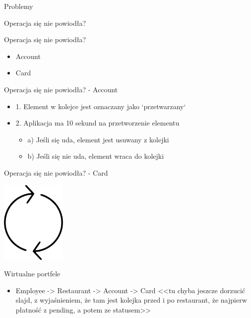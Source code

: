 \documentclass{beamer}
\begin{document}
\begin{frame}{Problemy}
	\begin{center}
		\Huge{Operacja się nie powiodła?}
	\end{center}
\end{frame}

\begin{frame}{Operacja się nie powiodła?}
	\begin{huge}
		\begin{itemize}
			\item Account
			\item Card
		\end{itemize}
	\end{huge}
\end{frame}

\begin{frame}{Operacja się nie powiodła? - Account}
	\begin{Large}
		\begin{itemize}[<+->]
			\item 1. Element w kolejce jest oznaczany jako `przetwarzany`
			\item 2. Aplikacja ma 10 sekund na przetworzenie elementu
			\begin{itemize}[<+->]
				\item \Large{a) Jeśli się uda, element jest usuwany z kolejki}
				\item \Large{b) Jeśli się nie uda, element wraca do kolejki}
			\end{itemize}
		\end{itemize}
	\end{Large}
\end{frame}

\begin{frame}{Operacja się nie powiodła? - Card}
	\begin{center}
		\includegraphics[height=4cm]{cykl1.png}
	\end{center}
\end{frame}

\begin{frame}{Wirtualne portfele}
	\begin{huge}
		\begin{itemize}
			\item Employee -> Restaurant -> Account -> Card <<tu chyba jeszcze dorzucić slajd, z wyjaśnieniem, że tam jest kolejka przed i po restaurant, że najpierw płatność z pending, a potem ze statusem>>
		\end{itemize}
	\end{huge}
\end{frame}
\end{document}
